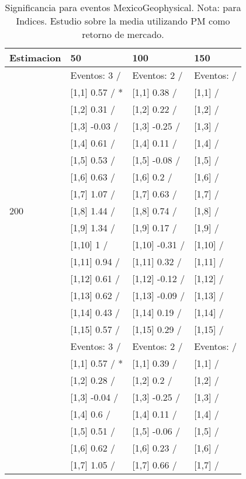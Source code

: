 \begin{table}

\caption{Significancia para eventos MexicoGeophysical. Nota: para Indices. Estudio sobre la media utilizando PM como retorno de mercado.}
\centering
\begin{tabular}[t]{llll}
\toprule
Estimacion & 50 & 100 & 150\\
\midrule
 & Eventos:  3 / & Eventos:  2 / & Eventos:   /\\
 & {}[1,1] 0.57  / * & {}[1,1] 0.38  / & {}[1,1]  /\\
 & {}[1,2] 0.31  / & {}[1,2] 0.22  / & {}[1,2]  /\\
 & {}[1,3] -0.03  / & {}[1,3] -0.25  / & {}[1,3]  /\\
 & {}[1,4] 0.61  / & {}[1,4] 0.11  / & {}[1,4]  /\\
\addlinespace
 & {}[1,5] 0.53  / & {}[1,5] -0.08  / & {}[1,5]  /\\
 & {}[1,6] 0.63  / & {}[1,6] 0.2  / & {}[1,6]  /\\
 & {}[1,7] 1.07  / & {}[1,7] 0.63  / & {}[1,7]  /\\
200 & {}[1,8] 1.44  / & {}[1,8] 0.74  / & {}[1,8]  /\\
 & {}[1,9] 1.34  / & {}[1,9] 0.17  / & {}[1,9]  /\\
\addlinespace
 & {}[1,10] 1  / & {}[1,10] -0.31  / & {}[1,10]  /\\
 & {}[1,11] 0.94  / & {}[1,11] 0.32  / & {}[1,11]  /\\
 & {}[1,12] 0.61  / & {}[1,12] -0.12  / & {}[1,12]  /\\
 & {}[1,13] 0.62  / & {}[1,13] -0.09  / & {}[1,13]  /\\
 & {}[1,14] 0.43  / & {}[1,14] 0.19  / & {}[1,14]  /\\
\addlinespace
 & {}[1,15] 0.57  / & {}[1,15] 0.29  / & {}[1,15]  /\\
 & Eventos:  3 / & Eventos:  2 / & Eventos:   /\\
 & {}[1,1] 0.57  / * & {}[1,1] 0.39  / & {}[1,1]  /\\
 & {}[1,2] 0.28  / & {}[1,2] 0.2  / & {}[1,2]  /\\
 & {}[1,3] -0.04  / & {}[1,3] -0.25  / & {}[1,3]  /\\
\addlinespace
 & {}[1,4] 0.6  / & {}[1,4] 0.11  / & {}[1,4]  /\\
 & {}[1,5] 0.51  / & {}[1,5] -0.06  / & {}[1,5]  /\\
 & {}[1,6] 0.62  / & {}[1,6] 0.23  / & {}[1,6]  /\\
 & {}[1,7] 1.05  / & {}[1,7] 0.66  / & {}[1,7]  /\\

\end{tabular}
\end{table}

